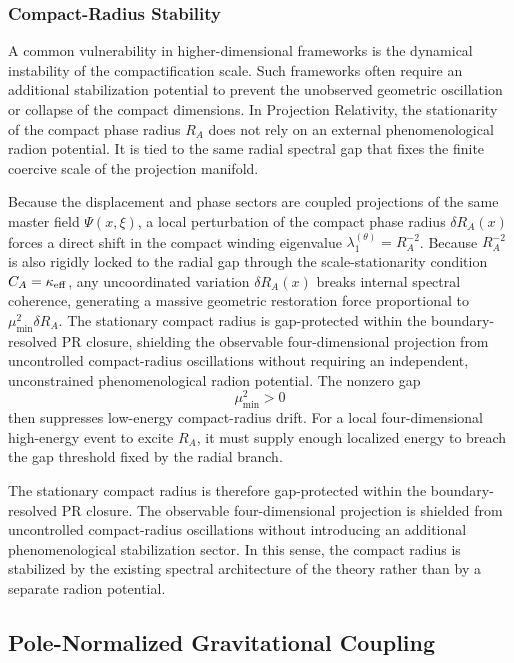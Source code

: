 \documentclass[11pt]{article}
\begin{document}
\subsubsection{Compact-Radius Stability}
\label{sec:compact_radius_stability}

A common vulnerability in higher-dimensional frameworks is the dynamical
instability of the compactification scale. Such frameworks often require an
additional stabilization potential to prevent the unobserved geometric
oscillation or collapse of the compact dimensions. In Projection Relativity, the
stationarity of the compact phase radius \(R_A\) does not rely on an external
phenomenological radion potential. It is tied to the same radial spectral gap
that fixes the finite coercive scale of the projection manifold.

Because the displacement and phase sectors are coupled projections of the same master field $\Psi(x,\xi)$, a local perturbation of the compact phase radius $\delta R_A(x)$ forces a direct shift in the compact winding eigenvalue $\lambda_1^{(\theta)} = R_A^{-2}$. Because \(R_A^{-2}\) is also rigidly locked to the radial gap through the scale-stationarity condition \(C_A=\kappa_{\rm eff}\), any uncoordinated variation \(\delta R_A(x)\) breaks internal spectral coherence, generating a massive geometric restoration force proportional to $\mu_{\min}^2 \delta R_A$. The stationary compact radius is gap-protected within the boundary-resolved PR closure, shielding the observable four-dimensional projection from uncontrolled compact-radius oscillations without requiring an independent, unconstrained phenomenological radion potential. The nonzero gap
\begin{equation}
\mu_{\min}^2>0
\end{equation}
then suppresses low-energy compact-radius drift. For a local four-dimensional
high-energy event to excite \(R_A\), it must supply enough localized energy to
breach the gap threshold fixed by the radial branch.

The stationary compact radius is therefore gap-protected within the
boundary-resolved PR closure. The observable four-dimensional projection is
shielded from uncontrolled compact-radius oscillations without introducing an
additional phenomenological stabilization sector. In this sense, the compact
radius is stabilized by the existing spectral architecture of the theory rather
than by a separate radion potential.

\subsection{Pole-Normalized Gravitational Coupling}
\label{sec:pole_normalized_gravitational_coupling}
\end{document}
